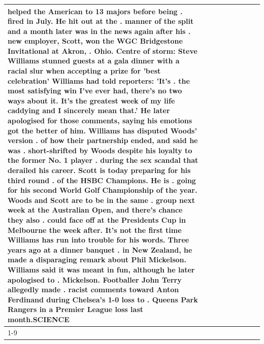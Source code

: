 \begin{table}[H]
\begin{tabular}{lllrlllll}
helped the American to 13 majors before being . fired in July. He hit out at the . manner of the split and a month later was in the news again after his . new employer, Scott, won the WGC Bridgestone Invitational at Akron, . Ohio. Centre of storm: Steve Williams stunned guests at a gala dinner with a racial slur when accepting a prize for 'best celebration' Williams had told reporters: 'It's . the most satisfying win I've ever had, there's no two ways about it. It's the greatest week of my life caddying and I sincerely mean that.' He later apologised for those comments, saying his emotions got the better of him. Williams has disputed Woods' version . of how their partnership ended, and said he was . short-shrifted by Woods despite his loyalty to the former No. 1 player . during the sex scandal that derailed his career. Scott is today preparing for his third round . of the HSBC Champions. He is . going for his second World Golf Championship of the year. Woods and Scott are to be in the same . group next week at the Australian Open, and there's chance they also . could face off at the Presidents Cup in Melbourne the week after. It's not the first time Williams has run into trouble for his words. Three years ago at a dinner banquet . in New Zealand, he made a disparaging remark about Phil Mickelson. Williams said it was meant in fun, although he later apologised to . Mickelson. Footballer John Terry allegedly made . racist comments toward Anton Ferdinand during Chelsea's 1-0 loss to . Queens Park Rangers in a Premier League loss last month.SCIENCE \\
\cline{1-9}

\end{tabular}
\end{table}
